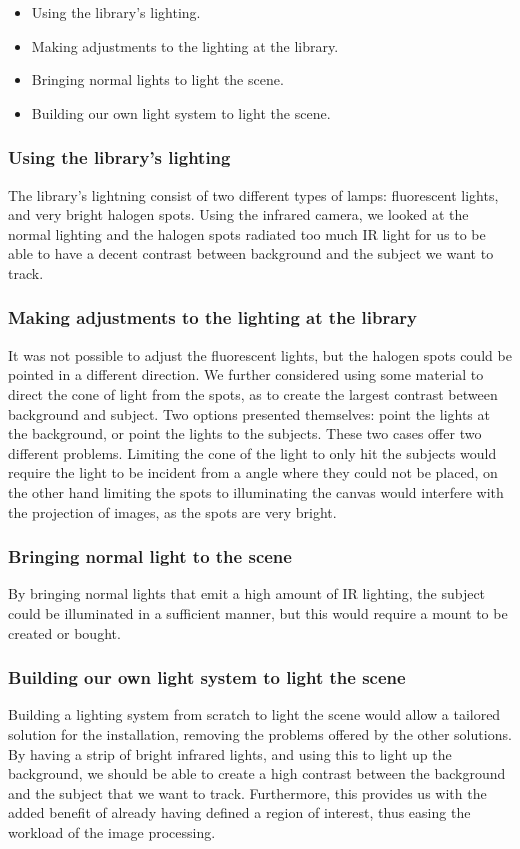 \begin{itemize}
\item Using the library's lighting.
\item Making adjustments to the lighting at the library.
\item Bringing normal lights to light the scene.
\item Building our own light system to light the scene.
\end{itemize}

\subsubsection{Using the library's lighting}
The library's lightning consist of two different types of lamps: fluorescent lights, and very bright halogen spots. Using the infrared camera, we looked at the normal lighting and the halogen spots radiated too much IR light for us to be able to have a decent contrast between background and the subject we want to track.

\subsubsection{Making adjustments to the lighting at the library}
It was not possible to adjust the fluorescent lights, but the halogen spots could be pointed in a different direction. We further considered using some material to direct the cone of light from the spots, as to create the largest contrast between background and subject. Two options presented themselves: point the lights at the background, or point the lights to the subjects. These two cases offer two different problems. Limiting the cone of the light to only hit the subjects would require the light to be incident from a angle where they could not be placed, on the other hand limiting the spots to illuminating the canvas would interfere with the projection of images, as the spots are very bright.

\subsubsection{Bringing normal light to the scene} 
By bringing normal lights that emit a high amount of IR lighting, the subject could be illuminated in a sufficient manner, but this would require a mount to be created or bought.

\subsubsection{Building our own light system to light the scene}
Building a lighting system from scratch to light the scene would allow a tailored solution for the installation, removing the problems offered by the other solutions. By having a strip of bright infrared lights, and using this to light up the background, we should be able to create a high contrast between the background and the subject that we want to track. Furthermore, this provides us with the added benefit of already having defined a region of interest, thus easing the workload of the image processing.

